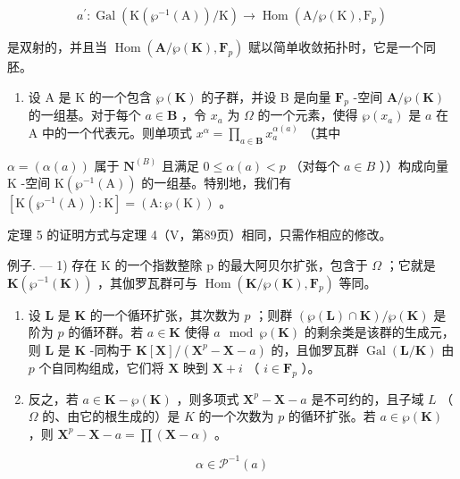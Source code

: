 \[
a ^ {\prime}: \operatorname{Gal} \left(\mathrm{K} \left(\wp^ {- 1} (\mathrm{A})\right) / \mathrm{K}\right)\rightarrow \operatorname{Hom} \left(\mathrm{A} / \wp (\mathrm{K}), \mathrm{F} _ {p}\right)
\]

是双射的，并且当 \(\operatorname{Hom}(\mathbf{A}/\wp(\mathbf{K}), \mathbf{F}_p)\) 赋以简单收敛拓扑时，它是一个同胚。

\begin{enumerate}
\def\labelenumi{\alph{enumi})}
\setcounter{enumi}{2}
\tightlist
\item
  设 A 是 K 的一个包含 \(\wp(\mathbf{K})\) 的子群，并设 B 是向量 \(\mathbf{F}_{p}\) -空间 \(\mathbf{A}/\wp(\mathbf{K})\) 的一组基。对于每个 \(a \in \mathbf{B}\) ，令 \(x_{a}\) 为 \(\Omega\) 的一个元素，使得 \(\wp(x_{a})\) 是 \(a\) 在 A 中的一个代表元。则单项式 \(x^{\alpha} = \prod_{a \in \mathbf{B}} x_{a}^{\alpha(a)}\) （其中
\end{enumerate}

\(\alpha = (\alpha(a))\) 属于 \(\mathbf{N}^{(B)}\) 且满足 \(0 \leqslant \alpha(a) < p\) （对每个 \(a \in B\) ））构成向量 \(\mathrm{K}\) -空间 \(\mathrm{K}(\wp^{-1}(\mathrm{A}))\) 的一组基。特别地，我们有 \([\mathrm{K}(\wp^{-1}(\mathrm{A})): \mathrm{K}] = (\mathrm{A}: \wp(\mathrm{K}))\) 。

定理 5 的证明方式与定理 4（V，第89页）相同，只需作相应的修改。

例子. --- 1) 存在 K 的一个指数整除 p 的最大阿贝尔扩张，包含于 \(\Omega\) ；它就是 \(\mathbf{K}(\wp^{-1}(\mathbf{K}))\) ，其伽罗瓦群可与 \(\operatorname{Hom}(\mathbf{K}/\wp(\mathbf{K}), \mathbf{F}_{p})\) 等同。

\begin{enumerate}
\def\labelenumi{\arabic{enumi})}
\setcounter{enumi}{1}
\item
  设 \(\mathbf{L}\) 是 \(\mathbf{K}\) 的一个循环扩张，其次数为 \(p\) ；则群 \((\wp(\mathbf{L}) \cap \mathbf{K}) / \wp(\mathbf{K})\) 是阶为 \(p\) 的循环群。若 \(a \in \mathbf{K}\) 使得 \(a \mod \wp(\mathbf{K})\) 的剩余类是该群的生成元，则 \(\mathbf{L}\) 是 \(\mathbf{K}\) -同构于 \(\mathbf{K}[\mathbf{X}] / (\mathbf{X}^p - \mathbf{X} - a)\) 的，且伽罗瓦群 \(\operatorname{Gal}(\mathbf{L} / \mathbf{K})\) 由 \(p\) 个自同构组成，它们将 \(\mathbf{X}\) 映到 \(\mathbf{X} + i\) （ \(i \in \mathbf{F}_p\) ）。
\item
  反之，若 \(a \in \mathbf{K} - \wp(\mathbf{K})\) ，则多项式 \(\mathbf{X}^p - \mathbf{X} - a\) 是不可约的，且子域 \(L\) （ \(\Omega\) 的、由它的根生成的）是 \(K\) 的一个次数为 \(p\) 的循环扩张。若 \(a \in \wp(\mathbf{K})\) ，则 \(\mathbf{X}^p - \mathbf{X} - a = \prod (\mathbf{X} - \alpha)\) 。
\end{enumerate}

\[
\alpha \in \mathcal {P} ^ {- 1} (a)
\]

